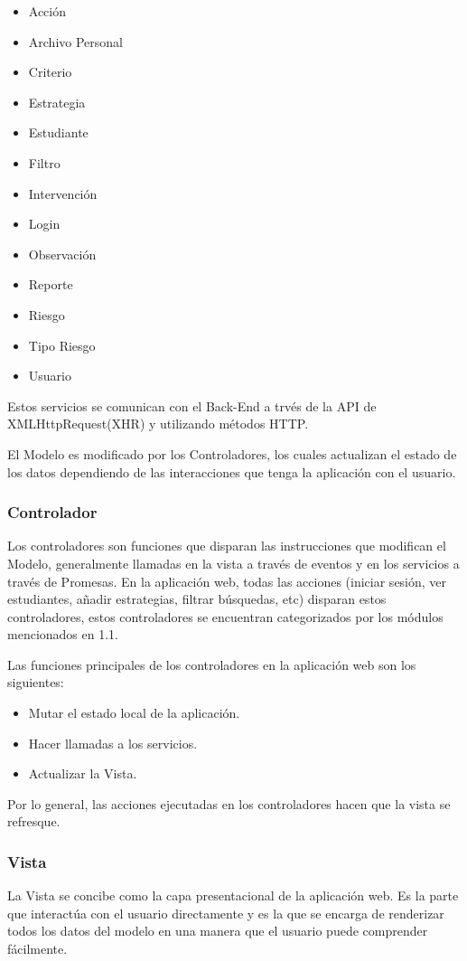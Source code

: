 \begin{itemize}
    \item Acción
    \item Archivo Personal
    \item Criterio
    \item Estrategia
    \item Estudiante
    \item Filtro
    \item Intervención
    \item Login
    \item Observación
    \item Reporte
    \item Riesgo
    \item Tipo Riesgo
    \item Usuario
\end{itemize}

Estos servicios se comunican con el Back-End a trvés de la API de XMLHttpRequest(XHR) y utilizando métodos HTTP.

El Modelo es modificado por los Controladores, los cuales actualizan el estado de los datos dependiendo de las interacciones que tenga la aplicación con el usuario.
\subsubsection{Controlador}
Los controladores son funciones que disparan las instrucciones que modifican el Modelo, generalmente llamadas en la vista a través de eventos y en los servicios a través de Promesas.
En la aplicación web, todas las acciones (iniciar sesión, ver estudiantes, añadir estrategias, filtrar búsquedas, etc) disparan estos controladores, estos controladores se encuentran categorizados por los módulos mencionados en 1.1.

Las funciones principales de los controladores en la aplicación web son los siguientes:

\begin{itemize}
    \item Mutar el estado local de la aplicación.
    \item Hacer llamadas a los servicios.
    \item Actualizar la Vista.
\end{itemize}

Por lo general, las acciones ejecutadas en los controladores hacen que la vista se refresque.

\subsubsection{Vista}
La Vista se concibe como la capa presentacional de la aplicación web. Es la parte que interactúa con el usuario directamente y es la que se encarga de renderizar todos los datos del modelo en una manera que el usuario puede comprender fácilmente. 

